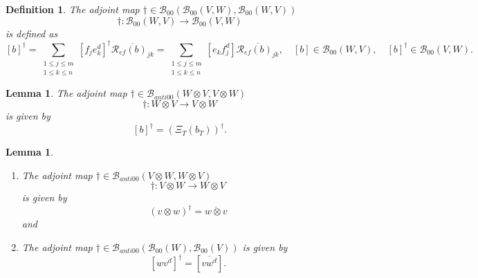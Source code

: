 \documentclass[aps,preprint]{revtex4}%
\newtheorem{definition}[theorem]{Definition}
\newtheorem{lemma}[theorem]{Lemma}
\begin{document}
\begin{definition}
The adjoint map $\dagger\in\mathcal{B}_{00}\left(  \mathcal{B}_{00}\left(
V,W\right)  ,\mathcal{B}_{00}\left(  W,V\right)  \right)  $%
\begin{equation}
\dagger:\mathcal{B}_{00}\left(  W,V\right)  \rightarrow\mathcal{B}_{00}\left(
V,W\right)
\end{equation}
is defined as
\begin{equation}
\left[  b\right]  ^{\dagger}=\sum_{\substack{1\leq j\leq m\\1\leq k\leq
n}}\left[  f_{j}e_{k}^{d}\right]  ^{\dagger}\overline{\mathcal{R}_{ef}\left(
b\right)  _{jk}}=\sum_{\substack{1\leq j\leq m\\1\leq k\leq n}}\left[
e_{k}f_{j}^{d}\right]  \overline{\mathcal{R}_{ef}\left(  b\right)  _{jk}%
},\quad\left[  b\right]  \in\mathcal{B}_{00}\left(  W,V\right)  ,\quad\left[
b\right]  ^{\dagger}\in\mathcal{B}_{00}\left(  V,W\right)  .
\end{equation}

\end{definition}

\begin{lemma}
The adjoint map $\dagger\in\mathcal{B}_{anti00}\left(  W\otimes V,V\otimes
W\right)  $
\begin{equation}
\dagger:W\otimes V\rightarrow V\otimes W
\end{equation}
is given by
\begin{equation}
\left[  b\right]  ^{\dagger}=\left(  \Xi_{T}\left(  b_{T}\right)  \right)
^{\dagger}.
\end{equation}

\end{lemma}

\begin{lemma}
\begin{enumerate}
\item The adjoint map $\dagger\in\mathcal{B}_{anti00}\left(  V\otimes
W,W\otimes V\right)  $
\begin{equation}
\dagger:V\otimes W\rightarrow W\otimes V
\end{equation}
is given by%
\begin{equation}
\left(  v\otimes w\right)  ^{\dagger}=\overline{w\otimes v}%
\end{equation}
and

\item The adjoint map $\dagger\in\mathcal{B}_{anti00}\left(  \mathcal{B}%
_{00}\left(  W\right)  ,\mathcal{B}_{00}\left(  V\right)  \right)  $ is given
by
\begin{equation}
\left[  wv^{d}\right]  ^{\dagger}=\left[  \overline{vw^{d}}\right]  .
\end{equation}

\end{enumerate}
\end{lemma}
\end{document}
